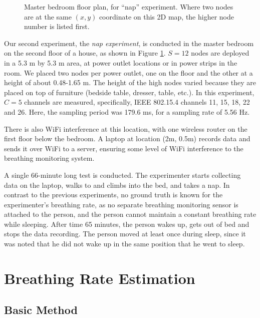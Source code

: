 \documentclass[10pt,journal,letterpaper]{IEEEtran}
\begin{document}
\begin{figure}[tbhp]
\centerline{  }
\caption{Master bedroom floor plan, for ``nap'' experiment.  Where two nodes are at the same $(x,y)$ coordinate on this 2D map, the higher node number is listed first.}
    \label{F:map_nap_experiment}
\end{figure}

Our second experiment, the \emph{nap experiment}, is conducted in the master bedroom on the second floor of a house, as shown in Figure \ref{F:map_nap_experiment}.  $S=12$ nodes are deployed in a 5.3 m by 5.3 m area, at power outlet locations or in power strips in the room.  We placed two nodes per power outlet, one on the floor and the other at a height of about 0.48-1.65 m.  The height of the high nodes varied because they are placed on top of furniture (bedside table, dresser, table, etc.).  In this experiment, $C=5$ channels are measured, specifically, IEEE 802.15.4 channels 11, 15, 18, 22 and 26.  Here, the sampling period was 179.6 ms, for a sampling rate of 5.56 Hz.

There is also WiFi interference at this location, with one wireless router on the first floor below the bedroom.  A laptop at location (2m, 0.5m) records data and sends it over WiFi to a server, ensuring some level of WiFi interference to the breathing monitoring system.

A single 66-minute long test is conducted.  The experimenter starts collecting data on the laptop, walks to and climbs into the bed, and takes a nap.  In contrast to the previous experiments, no ground truth is known for the experimenter's breathing rate, as no separate breathing monitoring sensor is attached to the person, and the person cannot maintain a constant breathing rate while sleeping.  After time 65 minutes, the person wakes up, gets out of bed and stops the data recording.  The person moved at least once during sleep, since it was noted that he did not wake up in the same position that he went to sleep.

\section{Breathing Rate Estimation} \label{S:Monitoring}

\subsection{Basic Method}
\end{document}
